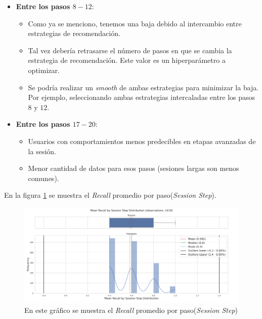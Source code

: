 \documentclass[11pt,a4paper,twoside]{thesis}
\begin{document}
\begin{itemize}
	\item \textbf{Entre los pasos $8-12$}:
	      \begin{itemize}
		      \item Como ya se menciono, tenemos una baja debido al intercambio entre estrategias de recomendación.
		      \item Tal vez debería retrasarse el número de pasos en que se cambia la estrategia de recomendación. Este valor es un hiperparámetro a optimizar.
		      \item Se podría realizar un \textit{smooth} de ambas estrategias para minimizar la baja. Por ejemplo, seleccionando ambas estrategias intercaladas entre los pasos $8$ y $12$.
	      \end{itemize}
	\item \textbf{Entre los pasos $17-20$}:
	      \begin{itemize}
		      \item Usuarios con comportamientos menos predecibles en etapas avanzadas de la sesión.
		      \item Menor cantidad de datos para esos pasos (sesiones largas son menos comunes).
	      \end{itemize}
\end{itemize}

\clearpage

En la figura \ref{fig:llama2-mean_recall_by_session_step_distribution} se muestra el \textit{Recall} promedio por paso(\textit{Session Step}).

\begin{figure}[htbp]
	\centering
	\includegraphics[width=15cm]{./images/llama2/mean_recall_by_session_step_distribution.png}
	\caption{En este gráfico se muestra el \textit{Recall} promedio por paso(\textit{Session Step})}
	\label{fig:llama2-mean_recall_by_session_step_distribution}
\end{figure}
\end{document}
